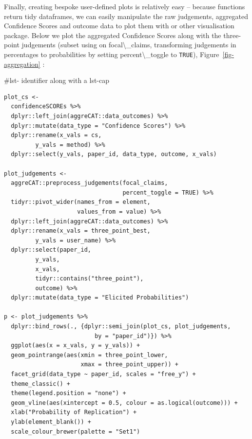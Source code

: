 \documentclass[article]{jss}
\newcommand{\fct}[1]{\code{#1()}}
\begin{document}
Finally, creating bespoke user-defined plots is relatively easy --
because  functions return tidy dataframes, we can easily
manipulate the raw judgements, aggregated Confidence Scores and outcome
data to plot them with  \citep{ggplot2016} or other
visualisation package. Below we plot the aggregated Confidence Scores
along with the three-point judgements (subset using
\fct{preprocess\_judgements} on {focal\textbackslash\_claims},
transforming judgements in percentages to probabilities by setting
{percent\textbackslash\_toggle} to \texttt{TRUE}),
Figure~\ref{fig-aggregation} :

\#lst- identifier along with a lst-cap

\begin{verbatim}
plot_cs <- 
  confidenceSCOREs %>% 
  dplyr::left_join(aggreCAT::data_outcomes) %>% 
  dplyr::mutate(data_type = "Confidence Scores") %>% 
  dplyr::rename(x_vals = cs,
         y_vals = method) %>% 
  dplyr::select(y_vals, paper_id, data_type, outcome, x_vals)

plot_judgements <- 
  aggreCAT::preprocess_judgements(focal_claims,
                                  percent_toggle = TRUE) %>% 
  tidyr::pivot_wider(names_from = element, 
                     values_from = value) %>%
  dplyr::left_join(aggreCAT::data_outcomes) %>% 
  dplyr::rename(x_vals = three_point_best,
         y_vals = user_name) %>% 
  dplyr::select(paper_id, 
         y_vals, 
         x_vals, 
         tidyr::contains("three_point"),
         outcome) %>% 
  dplyr::mutate(data_type = "Elicited Probabilities")

p <- plot_judgements %>%  
  dplyr::bind_rows(., {dplyr::semi_join(plot_cs, plot_judgements,
                          by = "paper_id")}) %>% 
  ggplot(aes(x = x_vals, y = y_vals)) +
  geom_pointrange(aes(xmin = three_point_lower, 
                      xmax = three_point_upper)) +
  facet_grid(data_type ~ paper_id, scales = "free_y") + 
  theme_classic() +
  theme(legend.position = "none") +
  geom_vline(aes(xintercept = 0.5, colour = as.logical(outcome))) +
  xlab("Probability of Replication") +
  ylab(element_blank()) +
  scale_colour_brewer(palette = "Set1")
\end{verbatim}
\end{document}

